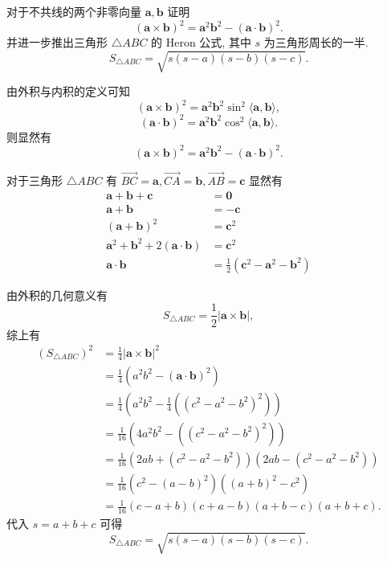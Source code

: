 \documentclass[cn,toc=twocol]{elegantbook}
\newcommand{\ve}[1]{\boldsymbol{#1}}
\newcommand{\Ve}[1]{\overrightarrow{#1}}
\newcommand{\vtimes}[2]{\ve{#1} \times \ve{#2}}
\begin{document}
\begin{example}
	对于不共线的两个非零向量 $\ve a, \ve b$ 证明
	\[
		(\vtimes{a}{b})^2 = \ve a^2 \ve b^2 - (\ve a \cdot \ve b)^2.
	\]
	并进一步推出三角形 $\triangle ABC$ 的 Heron 公式, 其中 $s$ 为三角形周长的一半.
	\[
		S_{\triangle ABC} = \sqrt{s (s - a)(s - b)(s - c)}.
	\]
\end{example}

\begin{solution}
	由外积与内积的定义可知
	\[
		(\vtimes{a}{b})^2 = \ve a^2 \ve b^2 \sin^2 \langle \ve a, \ve b \rangle,
	\]
	\[
		(\ve a \cdot \ve b)^2 = \ve a^2 \ve b^2 \cos^2 \langle \ve a, \ve b \rangle.
	\]
	则显然有
	\[
		(\vtimes{a}{b})^2 = \ve a^2 \ve b^2 - (\ve a \cdot \ve b)^2.
	\]
	\smallskip
	
	对于三角形 $\triangle ABC$ 有 $\Ve{BC} = \ve a, \Ve{CA} = \ve b, \Ve{AB} = \ve c$ 显然有
	\[
	\begin{aligned}
		\ve a + \ve b + \ve c &= \ve 0\\
		\ve a + \ve b &= -\ve c\\
		(\ve a + \ve b)^2 &= \ve c^2\\
		\ve a^2 + \ve b^2 + 2(\ve a \cdot \ve b) &= \ve c^2\\
		\ve a \cdot \ve b &= \frac{1}{2}\left(\ve c^2 - \ve a^2 - \ve b^2 \right)
	\end{aligned}
	\]
	
	由外积的几何意义有
	\[
		S_{\triangle ABC} = \frac{1}{2} \lvert \vtimes{a}{b} \rvert,
	\]
	综上有
	\[
		\begin{aligned}
			(S_{\triangle ABC})^2 &= \frac{1}{4} \lvert \vtimes{a}{b} \rvert^2\\
			&= \frac{1}{4} \left(a^2 b^2 - (\ve a \cdot \ve b)^2\right)\\
			&= \frac{1}{4} \left(a^2 b^2 - \frac{1}{4}\left(\left(c^2 - a^2 - b^2 \right)^2\right)\right)\\
			&= \frac{1}{16} \left(4 a^2 b^2 - \left(\left(c^2 - a^2 - b^2 \right)^2\right)\right)\\
			&= \frac{1}{16} \left(2ab + \left(c^2 - a^2 - b^2 \right)\right) \left(2ab - \left(c^2 - a^2 - b^2 \right)\right)\\
			&= \frac{1}{16} \left(c^2 - (a - b)^2\right) \left((a + b)^2 - c^2\right)\\
			&=\frac{1}{16} \left(c - a + b\right) \left(c + a - b\right) \left(a + b - c\right) \left(a + b + c\right).
		\end{aligned}
	\]
	代入 $s = a + b + c$ 可得
	\[
		S_{\triangle ABC} = \sqrt{s (s - a)(s - b)(s-c)}.
	\]
\end{solution}
\end{document}
